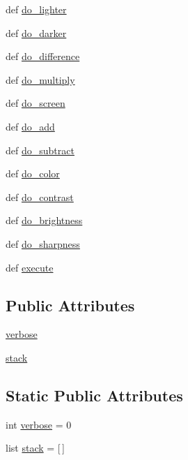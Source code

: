 \begin{DoxyCompactItemize}
\item 
def \hyperlink{classpildriver_1_1_p_i_l_driver_a77fe074fb85f8a2e56b3624e4617b94a}{do\-\_\-lighter}
\item 
def \hyperlink{classpildriver_1_1_p_i_l_driver_adb5b934b26a94c409763f035ad7d6a8d}{do\-\_\-darker}
\item 
def \hyperlink{classpildriver_1_1_p_i_l_driver_a92db6e11639e31aa886c359b97a17a72}{do\-\_\-difference}
\item 
def \hyperlink{classpildriver_1_1_p_i_l_driver_a4a0f6224fc40b4bf350ffbcd7896f102}{do\-\_\-multiply}
\item 
def \hyperlink{classpildriver_1_1_p_i_l_driver_ac949ae4a1dee5194b7c06e5b7a070923}{do\-\_\-screen}
\item 
def \hyperlink{classpildriver_1_1_p_i_l_driver_ab978364aab8b1ad7c066e81d3ce5ebe3}{do\-\_\-add}
\item 
def \hyperlink{classpildriver_1_1_p_i_l_driver_a449274a976edf59f8d2aebf2250ece51}{do\-\_\-subtract}
\item 
def \hyperlink{classpildriver_1_1_p_i_l_driver_ab6d12f655cd32d22721570d70c0d4bb2}{do\-\_\-color}
\item 
def \hyperlink{classpildriver_1_1_p_i_l_driver_a03be76c4aebabddc06900a3ea1218ed8}{do\-\_\-contrast}
\item 
def \hyperlink{classpildriver_1_1_p_i_l_driver_ae337f9a5670c86a6be65c2f6e48cf1d8}{do\-\_\-brightness}
\item 
def \hyperlink{classpildriver_1_1_p_i_l_driver_ae44e0e38648fe48b8b3318419f4671aa}{do\-\_\-sharpness}
\item 
def \hyperlink{classpildriver_1_1_p_i_l_driver_ab5a114e30e49a3cdae9dc052794b86f1}{execute}
\end{DoxyCompactItemize}
\subsection*{Public Attributes}
\begin{DoxyCompactItemize}
\item 
\hyperlink{classpildriver_1_1_p_i_l_driver_aae024b0073fe82381ff1bedcdb82373d}{verbose}
\item 
\hyperlink{classpildriver_1_1_p_i_l_driver_ae212e95c0bd3575083547765e7c022b7}{stack}
\end{DoxyCompactItemize}
\subsection*{Static Public Attributes}
\begin{DoxyCompactItemize}
\item 
int \hyperlink{classpildriver_1_1_p_i_l_driver_aeb2dfb6910101e7e92ce448c3e67826a}{verbose} = 0
\item 
list \hyperlink{classpildriver_1_1_p_i_l_driver_a4ffb2e8f7669cd8bc1ee1bb0dc6c2cd0}{stack} = \mbox{[}$\,$\mbox{]}
\end{DoxyCompactItemize}


